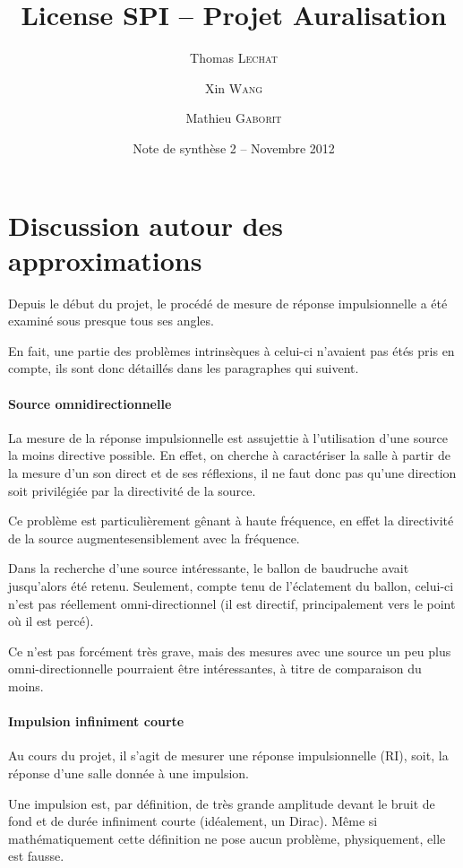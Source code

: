\documentclass[12pt]{article}
\title{License SPI -- Projet Auralisation}
\author{Thomas \textsc{Lechat} \and Xin \textsc{Wang} \and Mathieu \textsc{Gaborit}}
\date{Note de synthèse 2 -- Novembre 2012}
\begin{document}
 \maketitle

\tableofcontents
\newpage

\section{Discussion autour des approximations} %

Depuis le début du projet, le procédé de mesure de réponse impulsionnelle a été examiné sous presque tous ses angles.

En fait, une partie des problèmes intrinsèques à celui-ci n'avaient pas étés pris en compte, ils sont donc détaillés dans
les paragraphes qui suivent.

\paragraph{Source omnidirectionnelle} %

La mesure de la réponse impulsionnelle est assujettie à l'utilisation d'une source la moins directive possible.
En effet, on cherche à caractériser la salle à partir de la mesure d'un son direct et de ses réflexions, il ne faut donc
pas qu'une direction soit privilégiée par la directivité de la source.

Ce problème est particulièrement gênant à haute fréquence, en effet la directivité de la source augmentesensiblement
avec la fréquence.

Dans la recherche d'une source intéressante, le ballon de baudruche avait jusqu'alors été retenu.
Seulement, compte tenu de l'éclatement du ballon, celui-ci n'est pas réellement omni-directionnel (il est directif,
principalement vers le point où il est percé).

Ce n'est pas forcément très grave, mais des mesures avec une source un peu plus omni-directionnelle pourraient être
intéressantes, à titre de comparaison du moins.

\paragraph{Impulsion infiniment courte} %

Au cours du projet, il s'agit de mesurer une réponse impulsionnelle (RI), soit, la réponse d'une salle donnée à une
impulsion.

Une impulsion est, par définition, de très grande amplitude devant le bruit de fond et de durée infiniment courte
(idéalement, un Dirac). Même si mathématiquement cette définition ne pose aucun problème, physiquement, elle est
fausse.
\end{document}
